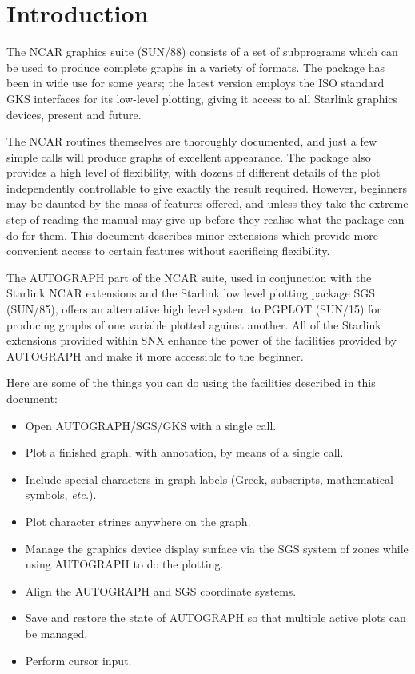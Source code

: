 \documentclass[11pt]{article}
\renewcommand{\_}{{\tt\char'137}}     %
\begin{document}
\newpage
\section {Introduction}

The NCAR graphics suite (SUN/88) consists of a set of subprograms which
can be used to produce complete graphs in a variety of formats.  The
package has been in wide use for some years; the latest version employs
the ISO standard GKS interfaces for its low-level plotting, giving it
access to all Starlink graphics devices, present and future.

The NCAR routines themselves are thoroughly documented, and just a few
simple calls will produce graphs of excellent appearance.  The package
also provides a high level of flexibility, with dozens of different
details of the plot independently controllable to give exactly the
result required.  However, beginners may be daunted by the mass of
features offered, and unless they take the extreme step of reading the
manual may give up before they realise what the package can do for
them.  This document describes minor extensions which provide more
convenient access to certain features without sacrificing flexibility.

The AUTOGRAPH part of the NCAR suite, used in conjunction with the
Starlink NCAR extensions and the Starlink low level plotting package
SGS (SUN/85), offers an alternative high level system to PGPLOT
(SUN/15) for producing graphs of one variable plotted against another.
All of the Starlink extensions provided within SNX enhance the power of
the facilities provided by AUTOGRAPH and make it more accessible to the
beginner.

Here are some of the things you can do using the facilities described
in this document:

\begin{itemize}

\item Open AUTOGRAPH/SGS/GKS with a single call.

\item Plot a finished graph, with annotation, by means of a single call.

\item Include special characters in graph labels (Greek, subscripts,
mathematical symbols, {\em etc.}).

\item Plot character strings anywhere on the graph.

\item Manage the graphics device display surface via the SGS system of
zones while using AUTOGRAPH to do the plotting.

\item Align the AUTOGRAPH and SGS coordinate systems.

\item Save and restore the state of AUTOGRAPH so that multiple active
plots can be managed.

\item Perform cursor input.

\end{itemize}
\end{document}
